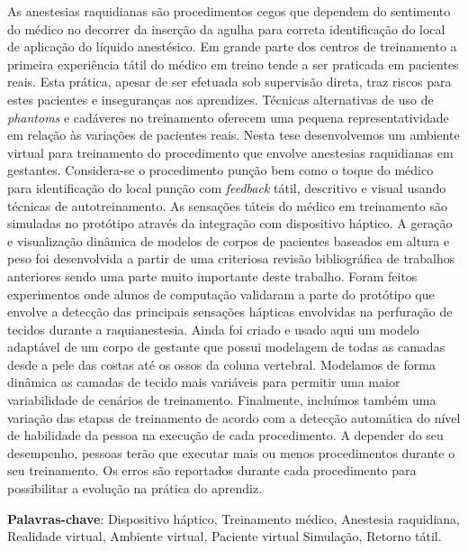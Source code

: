 \begin{resumo}


As anestesias raquidianas são procedimentos cegos que dependem do sentimento do médico no decorrer da inserção da agulha para correta identificação do local de aplicação do líquido anestésico. Em grande parte dos centros de treinamento a primeira experiência tátil do médico em treino tende a ser praticada em pacientes reais. Esta prática, apesar de ser efetuada sob supervisão direta, traz riscos para estes pacientes e inseguranças aos aprendizes. Técnicas alternativas de uso de \textit{phantoms} e cadáveres no treinamento oferecem uma pequena representatividade em relação às variações de pacientes reais. 
Nesta tese desenvolvemos um ambiente virtual para treinamento do procedimento que envolve anestesias raquidianas em gestantes. Considera-se o procedimento punção bem como o toque do médico para identificação do local punção com \textit{feedback} tátil, descritivo e visual usando técnicas de autotreinamento. As sensações táteis do médico em treinamento são simuladas no protótipo através da integração com dispositivo háptico. A geração e visualização dinâmica de modelos de corpos de pacientes baseados em altura e peso foi desenvolvida a partir de uma criteriosa revisão bibliográfica de trabalhos anteriores sendo uma parte muito importante deste trabalho. 
Foram feitos experimentos onde alunos de computação validaram a parte do protótipo que envolve a detecção das principais sensações hápticas envolvidas na perfuração de tecidos durante a raquianestesia. Ainda foi criado e usado aqui um modelo adaptável de um corpo de gestante que possui modelagem de todas as camadas desde a pele das costas até os ossos da coluna vertebral. Modelamos de forma dinâmica as camadas de tecido mais variáveis para permitir uma maior variabilidade de cenários de treinamento. Finalmente, incluímos também uma variação das etapas de treinamento de acordo com a detecção automática do nível de habilidade da pessoa na execução de cada procedimento. A depender do seu desempenho, pessoas terão que executar mais ou menos procedimentos durante o seu treinamento. Os erros são reportados durante cada procedimento para possibilitar a evolução na prática do aprendiz.

{\hspace{-8mm} \bf{Palavras-chave}}: Dispositivo háptico, Treinamento médico, Anestesia raquidiana, Realidade virtual, Ambiente virtual, Paciente virtual Simulação, Retorno tátil.

\end{resumo}

